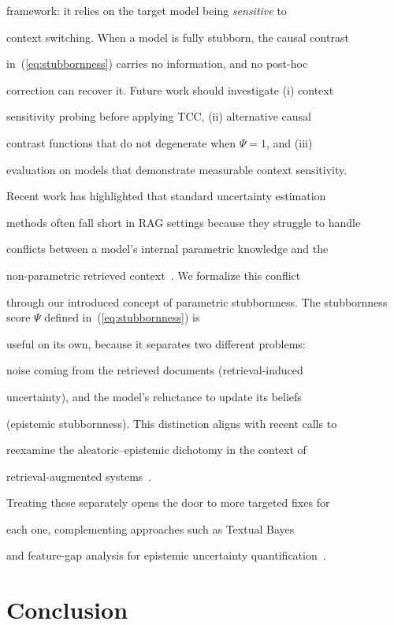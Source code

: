 \documentclass[10pt,twoside]{article}
\numberwithin{equation}{section}
\begin{document}
framework: it relies on the target model being \emph{sensitive} to

context switching. When a model is fully stubborn, the causal contrast

in~(\ref{eq:stubbornness}) carries no information, and no post-hoc

correction can recover it. Future work should investigate (i) context

sensitivity probing before applying TCC, (ii) alternative causal

contrast functions that do not degenerate when $\Psi = 1$, and (iii)

evaluation on models that demonstrate measurable context sensitivity.



Recent work has highlighted that standard uncertainty estimation

methods often fall short in RAG settings because they struggle to handle

conflicts between a model's internal parametric knowledge and the 

non-parametric retrieved context~\cite{soudani2025uncertainty}. We formalize this conflict 

through our introduced concept of parametric stubbornness. The stubbornness score $\Psi$ defined in~(\ref{eq:stubbornness}) is

useful on its own, because it separates two different problems:

noise coming from the retrieved documents (retrieval-induced

uncertainty), and the model's reluctance to update its beliefs

(epistemic stubbornness). This distinction aligns with recent calls to

reexamine the aleatoric--epistemic dichotomy in the context of

retrieval-augmented systems~\cite{kirchhof2025reexamining}.

Treating these separately opens the door to more targeted fixes for

each one, complementing approaches such as Textual Bayes~\cite{ross2025textual}

and feature-gap analysis for epistemic uncertainty quantification~\cite{bakman2025uncertainty}.




\section*{Conclusion}
\end{document}
